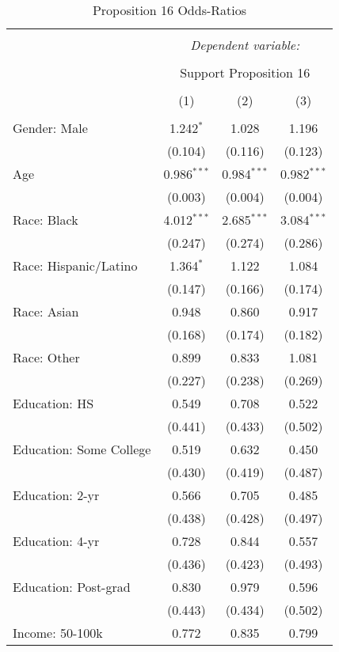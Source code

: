 
\begin{table}[!htbp] \centering 
  \caption{Proposition 16 Odds-Ratios} 
  \label{} 
\footnotesize 
\begin{tabular}{@{\extracolsep{5pt}}lccc} 
\\[-1.8ex]\hline 
\hline \\[-1.8ex] 
 & \multicolumn{3}{c}{\textit{Dependent variable:}} \\ 
\cline{2-4} 
\\[-1.8ex] & \multicolumn{3}{c}{Support Proposition 16} \\ 
\\[-1.8ex] & (1) & (2) & (3)\\ 
\hline \\[-1.8ex] 
 Gender: Male & 1.242$^{*}$ & 1.028 & 1.196 \\ 
  & (0.104) & (0.116) & (0.123) \\ 
  Age & 0.986$^{***}$ & 0.984$^{***}$ & 0.982$^{***}$ \\ 
  & (0.003) & (0.004) & (0.004) \\ 
  Race: Black & 4.012$^{***}$ & 2.685$^{***}$ & 3.084$^{***}$ \\ 
  & (0.247) & (0.274) & (0.286) \\ 
  Race: Hispanic/Latino & 1.364$^{*}$ & 1.122 & 1.084 \\ 
  & (0.147) & (0.166) & (0.174) \\ 
  Race: Asian & 0.948 & 0.860 & 0.917 \\ 
  & (0.168) & (0.174) & (0.182) \\ 
  Race: Other & 0.899 & 0.833 & 1.081 \\ 
  & (0.227) & (0.238) & (0.269) \\ 
  Education: HS & 0.549 & 0.708 & 0.522 \\ 
  & (0.441) & (0.433) & (0.502) \\ 
  Education: Some College & 0.519 & 0.632 & 0.450 \\ 
  & (0.430) & (0.419) & (0.487) \\ 
  Education: 2-yr & 0.566 & 0.705 & 0.485 \\ 
  & (0.438) & (0.428) & (0.497) \\ 
  Education: 4-yr & 0.728 & 0.844 & 0.557 \\ 
  & (0.436) & (0.423) & (0.493) \\ 
  Education: Post-grad & 0.830 & 0.979 & 0.596 \\ 
  & (0.443) & (0.434) & (0.502) \\ 
  Income: 50-100k & 0.772 & 0.835 & 0.799 \\ 

\end{tabular}
\end{table}
